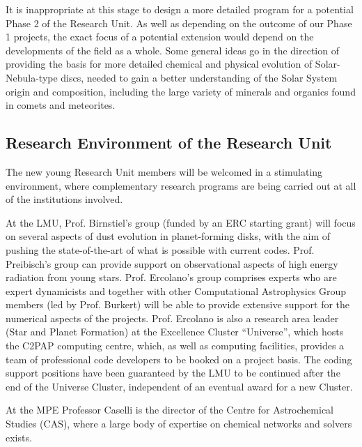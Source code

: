 \documentclass[10pt,fleqn,twoside]{article}
\begin{document}
It is inappropriate at this stage to design a more detailed program
for a potential Phase 2 of the Research Unit. As well as depending on
the outcome of our Phase 1 projects, the exact focus of a potential
extension would depend on the developments of the field as a
whole. Some general ideas go in the direction of providing the basis for more detailed chemical
and physical evolution of Solar-Nebula-type discs, needed to gain a
better understanding of the Solar System origin and composition,
including the large variety of minerals and organics found in comets
and meteorites. 
\vspace{0.8em}

\subsection{Research Environment of the Research Unit}

The new young Research Unit members will be welcomed in a stimulating
environment, where complementary research programs are being carried
out at all of the institutions involved. 

At the LMU, Prof. Birnstiel's group (funded by an ERC starting grant)
will focus on several aspects of dust evolution in planet-forming
disks, with the aim of pushing the state-of-the-art of what is
possible with current codes. Prof. Preibisch's group can provide
support on observational aspects of high energy radiation from young
stars. Prof. Ercolano's group comprises experts who are expert
dynamicists
and together with other Computational Astrophysics Group members (led
by Prof. Burkert) will be
able to provide extensive support for the numerical aspects of the
projects. Prof. Ercolano is also a research area leader (Star and
Planet Formation) at the
Excellence Cluster ``Universe'', which hosts the C2PAP computing
centre, which, as well as computing facilities, provides a team of
professional code developers to be booked on a project basis. The
coding support positions have been guaranteed by the LMU to be
continued after the end of the Universe Cluster, independent of an
eventual award for a new Cluster. 

At the MPE Professor Caselli is the director of the Centre for Astrochemical
Studies (CAS), where a large body of expertise on chemical
networks and solvers exists. 
\end{document}
